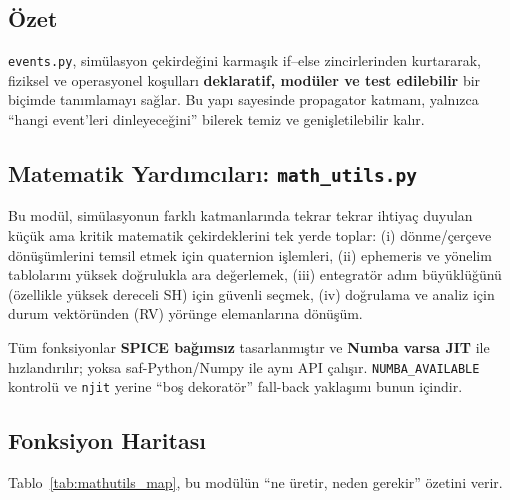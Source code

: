\subsection*{Özet}
\texttt{events.py}, simülasyon çekirdeğini karmaşık if–else zincirlerinden kurtararak,
fiziksel ve operasyonel koşulları
\textbf{deklaratif, modüler ve test edilebilir}
bir biçimde tanımlamayı sağlar.
Bu yapı sayesinde propagator katmanı,
yalnızca “hangi event’leri dinleyeceğini” bilerek
temiz ve genişletilebilir kalır.



\newpage
\subsection{Matematik Yardımcıları: \texttt{math\_utils.py}}
\label{subsec:math_utils}

Bu modül, simülasyonun farklı katmanlarında tekrar tekrar ihtiyaç duyulan küçük ama kritik matematik çekirdeklerini tek yerde toplar:
(i) dönme/çerçeve dönüşümlerini temsil etmek için quaternion işlemleri,
(ii) ephemeris ve yönelim tablolarını yüksek doğrulukla ara değerlemek,
(iii) entegratör adım büyüklüğünü (özellikle yüksek dereceli SH) için güvenli seçmek,
(iv) doğrulama ve analiz için durum vektöründen (RV) yörünge elemanlarına dönüşüm.

Tüm fonksiyonlar \textbf{SPICE bağımsız} tasarlanmıştır ve \textbf{Numba varsa JIT} ile hızlandırılır; yoksa saf-Python/Numpy ile aynı API çalışır. \texttt{NUMBA\_AVAILABLE} kontrolü ve \texttt{njit} yerine ``boş dekoratör'' fall-back yaklaşımı bunun içindir.

\subsection*{Fonksiyon Haritası}
Tablo~\ref{tab:mathutils_map}, bu modülün “ne üretir, neden gerekir” özetini verir.

